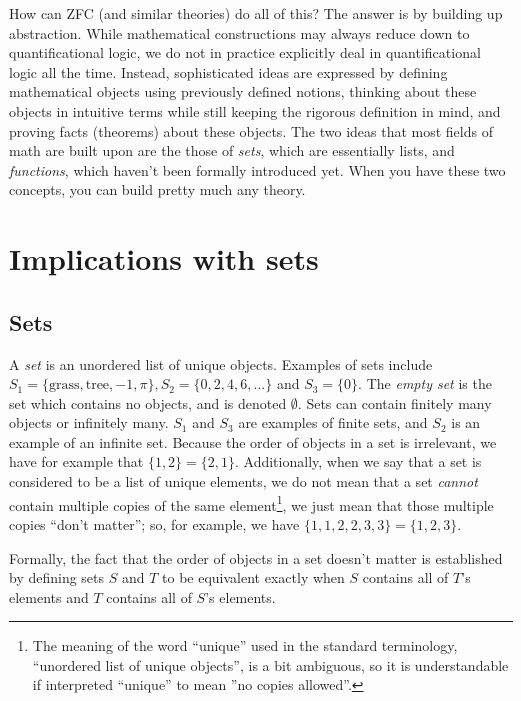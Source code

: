 How can ZFC (and similar theories) do all of this? The answer is by building up abstraction. While mathematical constructions may always reduce down to quantificational logic, we do not in practice explicitly deal in quantificational logic all the time. Instead, sophisticated ideas are expressed by defining mathematical objects using previously defined notions, thinking about these objects in intuitive terms while still keeping the rigorous definition in mind, and proving facts (theorems) about these objects. The two ideas that most fields of math are built upon are the those of \textit{sets}, which are essentially lists, and \textit{functions}, which haven't been formally introduced yet. When you have these two concepts, you can build pretty much any theory.

\newpage

\section{Implications with sets}

\subsection*{Sets}

A \textit{set} is an unordered list of unique objects. Examples of sets include $S_1 = \{\text{grass}, \text{tree}, -1, \pi\}, S_2 = \{0, 2, 4, 6, ...\}$ and $S_3 = \{0\}$. The \textit{empty set} is the set which contains no objects, and is denoted $\emptyset$. Sets can contain finitely many objects or infinitely many. $S_1$ and $S_3$ are examples of finite sets, and $S_2$ is an example of an infinite set. Because the order of objects in a set is irrelevant, we have for example that $\{1, 2\} = \{2, 1\}$. Additionally, when we say that a set is considered to be a list of unique elements, we do not mean that a set \textit{cannot} contain multiple copies of the same element\footnote{The meaning of the word ``unique'' used in the standard terminology, ``unordered list of unique objects'', is a bit ambiguous, so it is understandable if interpreted ``unique'' to mean ''no copies allowed''.}, we just mean that those multiple copies ``don't matter''; so, for example, we have $\{1, 1, 2, 2, 3, 3 \} = \{1, 2, 3\}$.

Formally, the fact that the order of objects in a set doesn't matter is established by defining sets $S$ and $T$ to be equivalent exactly when $S$ contains all of $T$'s elements and $T$ contains all of $S$'s elements.

